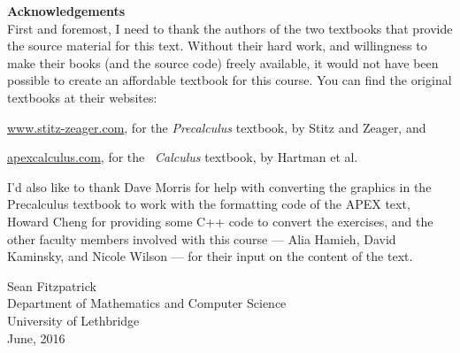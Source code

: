 \newpage

\noindent\textbf{\large Acknowledgements}\\

First and foremost, I need to thank the authors of the two textbooks that provide the source material for this text. Without their hard work, and willingness to make their books (and the source code) freely available, it would not have been possible to create an affordable textbook for this course. You can find the original textbooks at their websites:

\bigskip


\href{http://www.stitz-zeager.com}{www.stitz-zeager.com}, for the \textit{Precalculus} textbook, by Stitz and Zeager, and

\bigskip


\href{http://www.apexcalculus.com}{apexcalculus.com}, for the \apex\ \textit{Calculus} textbook, by Hartman et al.

\bigskip

I'd also like to thank Dave Morris for help with converting the graphics in the Precalculus textbook to work with the formatting code of the APEX text, Howard Cheng for providing some C++ code to convert the exercises, and the other faculty members involved with this course --- Alia Hamieh, David Kaminsky, and Nicole Wilson --- for their input on the content of the text.

\vspace{1in}

\begin{raggedright}
Sean Fitzpatrick\\
Department of Mathematics and Computer Science\\
University of Lethbridge\\
June, 2016
\end{raggedright}




